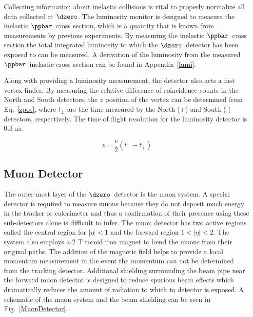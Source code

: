 Collecting information about inelastic collisions is vital to properly normalize all data collected at $\dzero$. The luminosity monitor is designed to measure the inelastic $\ppbar$~cross section, which is a quantity that is known from measurements by previous experiments. By measuring the inelastic $\ppbar$~cross section the total integrated luminosity to which the $\dzero$~detector has been exposed to can be measured. A derivation of the luminosity from the measured $\ppbar$~inelastic cross section can be found in Appendix~\ref{lumi}.

Along with providing a luminosity measurement, the detector also acts a fast vertex finder. By measuring the relative difference of coincidence counts in the North and South detectors, the $z$ position of the vertex can be determined from Eq.~\ref{zpos}, where $t_{\pm}$ are the time measured by the North (+) and South (-) detectors, respectively. The time of flight resolution for the luminosity detector is 0.3 ns.

\begin{equation}
\label{zpos}
z = \frac{c}{2}(t_{-} - t_{+})
\end{equation}

\subsection{Muon Detector}
\label{muondetector}

The outer-most layer of the $\dzero$~detector is the muon system. A special detector is required to measure muons because they do not deposit much energy in the tracker or calorimeter and thus a confirmation of their presence using these sub-detectors alone is difficult to infer. The muon detector has two active regions called the central region for $|\eta|<1$ and the forward region $1<|\eta|<2$. The system also employs a 2 T toroid iron magnet to bend the muons from their original paths. The addition of the magnetic field helps to provide a local momentum measurement in the event the momentum can not be determined from the tracking detector. Additional shielding surrounding the beam pipe near the forward muon detector is designed to reduce spurious beam effects which dramatically reduces the amount of radiation to which to detector is exposed. A schematic of the muon system and the beam shielding can be seen in Fig.~\ref{MuonDetector}.


